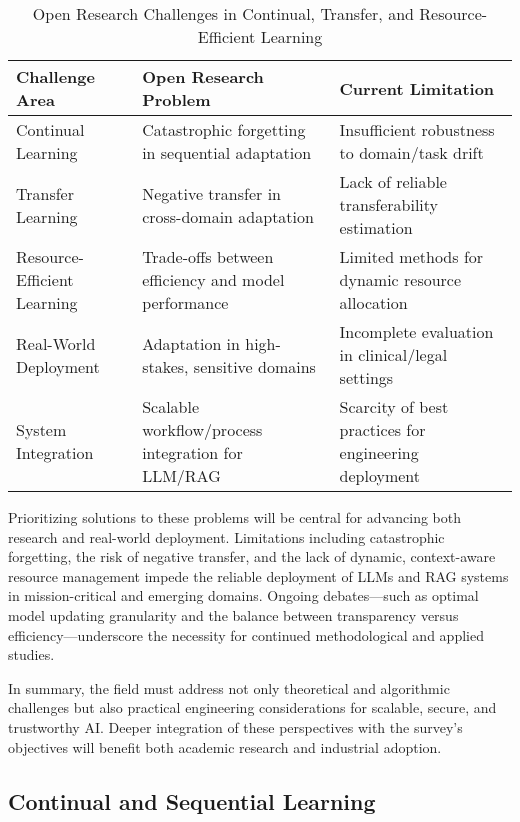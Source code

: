 \documentclass[sigconf]{acmart}
\begin{document}
\begin{table*}[htbp]
\centering
\caption{Open Research Challenges in Continual, Transfer, and Resource-Efficient Learning}
\label{tab:openproblems}
\begin{adjustbox}{max width=\textwidth}
\begin{tabular}{@{}lll@{}}
\toprule
Challenge Area & Open Research Problem & Current Limitation \\ 
\midrule
Continual Learning & Catastrophic forgetting in sequential adaptation & Insufficient robustness to domain/task drift \\
Transfer Learning & Negative transfer in cross-domain adaptation & Lack of reliable transferability estimation \\
Resource-Efficient Learning & Trade-offs between efficiency and model performance & Limited methods for dynamic resource allocation \\
Real-World Deployment & Adaptation in high-stakes, sensitive domains & Incomplete evaluation in clinical/legal settings \\
System Integration & Scalable workflow/process integration for LLM/RAG & Scarcity of best practices for engineering deployment \\
\bottomrule
\end{tabular}
\end{adjustbox}
\end{table*}

Prioritizing solutions to these problems will be central for advancing both research and real-world deployment. Limitations including catastrophic forgetting, the risk of negative transfer, and the lack of dynamic, context-aware resource management impede the reliable deployment of LLMs and RAG systems in mission-critical and emerging domains. Ongoing debates—such as optimal model updating granularity and the balance between transparency versus efficiency—underscore the necessity for continued methodological and applied studies.

In summary, the field must address not only theoretical and algorithmic challenges but also practical engineering considerations for scalable, secure, and trustworthy AI. Deeper integration of these perspectives with the survey's objectives will benefit both academic research and industrial adoption.

\subsection{Continual and Sequential Learning}
\end{document}
